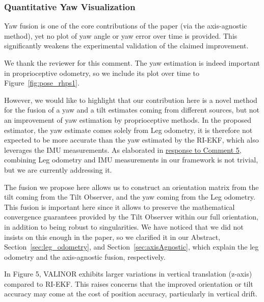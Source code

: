  

\subsubsection{Quantitative Yaw Visualization}

\begin{revquote}
Yaw fusion is one of the core contributions of the paper (via the axis-agnostic method), yet no plot of yaw angle or yaw error over time is provided. This significantly weakens the experimental validation of the claimed improvement.
\end{revquote}

We thank the reviewer for this comment. The yaw estimation is indeed important in proprioceptive odometry, so we include its plot over time to Figure~\ref{fig:pose_rhps1}.

However, we would like to highlight that our contribution here is a novel method for the fusion of a yaw and a tilt estimates coming from different sources, but not an improvement of yaw estimation by proprioceptive methods. In the proposed estimator, the yaw estimate comes solely from Leg odometry, it is therefore not expected to be more accurate than the yaw estimated by the RI-EKF, which also leverages the IMU measurements. As elaborated in \hyperlink{CommentSe3Fusion}{response to Comment 5}, combining Leg odometry and IMU measurements in our framework is not trivial, but we are currently addressing it.

The fusion we propose here allows us to construct an orientation matrix from the tilt coming from the Tilt Observer, and the yaw coming from the Leg odometry.
This fusion is important here since it allows to preserve the mathematical convergence guarantees provided by the Tilt Observer within our full orientation, in addition to being robust to singularities. 
We have noticed that we did not insists on this enough in the paper, so we clarified it in our Abstract, Section~\ref{sec:leg_odometry}, and Section~\ref{sec:axisAgnostic}, which explain the leg odometry and the axis-agnostic fusion, respectively.



\begin{revquote}
In Figure 5, VALINOR exhibits larger variations in vertical translation (z-axis) compared to RI-EKF. This raises concerns that the improved orientation or tilt accuracy may come at the cost of position accuracy, particularly in vertical drift.
\end{revquote}

